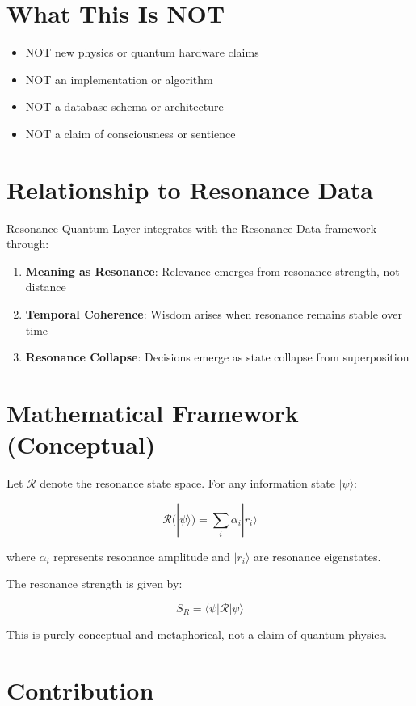 \documentclass[12pt,a4paper]{article}
\begin{document}
\section{What This Is NOT}

\begin{itemize}
\item NOT new physics or quantum hardware claims
\item NOT an implementation or algorithm
\item NOT a database schema or architecture
\item NOT a claim of consciousness or sentience
\end{itemize}

\section{Relationship to Resonance Data}

Resonance Quantum Layer integrates with the Resonance Data framework through:

\begin{enumerate}
\item \textbf{Meaning as Resonance}: Relevance emerges from resonance strength, not distance
\item \textbf{Temporal Coherence}: Wisdom arises when resonance remains stable over time
\item \textbf{Resonance Collapse}: Decisions emerge as state collapse from superposition
\end{enumerate}

\section{Mathematical Framework (Conceptual)}

Let $\mathcal{R}$ denote the resonance state space. For any information state $|\psi\rangle$:

\[
\mathcal{R}(|\psi\rangle) = \sum_i \alpha_i |r_i\rangle
\]

where $\alpha_i$ represents resonance amplitude and $|r_i\rangle$ are resonance eigenstates.

The resonance strength is given by:

\[
S_R = \langle\psi|\mathcal{R}|\psi\rangle
\]

This is purely conceptual and metaphorical, not a claim of quantum physics.

\section{Contribution}
\end{document}
